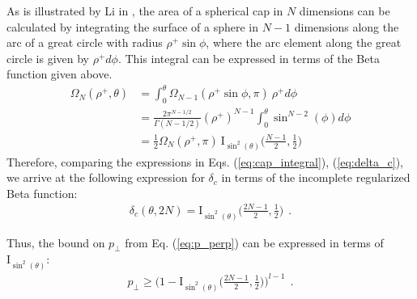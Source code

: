 As is illustrated by Li in \cite{Li2011}, the area of a spherical cap in $N$ dimensions can be calculated by integrating the surface of a sphere in $N-1$ dimensions along the arc of a great circle with radius $\rho^+\sin\phi$, where the arc element along the great circle is given by $\rho^+d\phi$. This integral can be expressed in terms of the Beta function given above.
\begin{equation}\label{eq:cap_integral}
    \begin{aligned}
        \Omega_N(\rho^+,\theta) &= \int_0^\theta \Omega_{N-1}(\rho^+\sin\phi,\pi)\ \rho^+d\phi\\
        &= \frac{2\pi^{N-1/2}}{\Gamma(N-1/2)}(\rho^+)^{N-1}  \int_0^\theta \sin^{N-2}(\phi)d\phi\\
        &= \frac{1}{2} \Omega_N(\rho^+,\pi)\  \text{I}_{\sin^2(\theta)}\bigg(\frac{N-1}{2},\frac{1}{2}\bigg)
    \end{aligned}
\end{equation}
Therefore, comparing the expressions in Eqs. (\ref{eq:cap_integral}), (\ref{eq:delta_c}), we arrive at the following expression for $\delta_c$ in terms of the incomplete regularized Beta function:
\begin{equation}\label{eq:delta_c_beta}
    \begin{aligned}
        \delta_c(\theta,2N) = \text{I}_{\sin^2(\theta)}\bigg(\frac{2N-1}{2},\frac{1}{2}\bigg) \ \ .
    \end{aligned}
\end{equation}

Thus, the bound on $p_\perp$ from Eq. (\ref{eq:p_perp}) can be expressed in terms of $\text{I}_{\sin^2(\theta)}$:
\begin{equation}\label{eq:p_perp_beta}
    \begin{aligned}
        p_{\perp} \geq \bigg(1-\text{I}_{\sin^2(\theta)}\bigg(\frac{2N-1}{2},\frac{1}{2}\bigg)\bigg)^{l-1} \ \ .
    \end{aligned}
\end{equation}